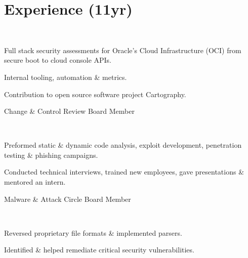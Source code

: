 \documentclass[]{hieudo-build}
\begin{document}
	\hfill
	\begin{minipage}[t]{0.65\textwidth} 
		
		\section{Experience (11yr)}
		
		\\
		\vspace{0.9em} %
		\begin{tightemize}
			\item Full stack security assessments for Oracle's Cloud Infrastructure (OCI) from secure boot to cloud console APIs.
			\item Internal tooling, automation \& metrics.
			\item Contribution to open source software project Cartography.
			\item Change \& Control Review Board Member
		\end{tightemize}
		\sectionsep
		
		\\
		\vspace{0.9em} %
		\begin{tightemize}
			\item Preformed static \& dynamic code analysis, exploit development, penetration testing \& phishing campaigns.
			\item Conducted technical interviews, trained new employees, gave presentations \& mentored an intern.
			\item Malware \& Attack Circle Board Member
		\end{tightemize}
		\sectionsep
		
		 \\
		\begin{tightemize}
			\item Reversed proprietary file formats \& implemented parsers.
			\item Identified \& helped remediate critical security vulnerabilities.
		\end{tightemize}
		\sectionsep
		

\end{minipage}
\end{document}
